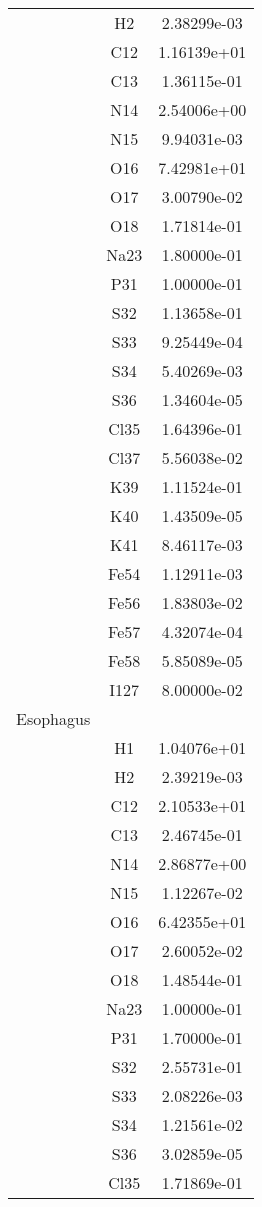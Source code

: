 \begin{centering}
\begin{longtable}{l c c}
& H2 & 2.38299e-03 \\ 
& C12 & 1.16139e+01 \\ 
& C13 & 1.36115e-01 \\ 
& N14 & 2.54006e+00 \\ 
& N15 & 9.94031e-03 \\ 
& O16 & 7.42981e+01 \\ 
& O17 & 3.00790e-02 \\ 
& O18 & 1.71814e-01 \\ 
& Na23 & 1.80000e-01 \\ 
& P31 & 1.00000e-01 \\ 
& S32 & 1.13658e-01 \\ 
& S33 & 9.25449e-04 \\ 
& S34 & 5.40269e-03 \\ 
& S36 & 1.34604e-05 \\ 
& Cl35 & 1.64396e-01 \\ 
& Cl37 & 5.56038e-02 \\ 
& K39 & 1.11524e-01 \\ 
& K40 & 1.43509e-05 \\ 
& K41 & 8.46117e-03 \\ 
& Fe54 & 1.12911e-03 \\ 
& Fe56 & 1.83803e-02 \\ 
& Fe57 & 4.32074e-04 \\ 
& Fe58 & 5.85089e-05 \\ 
& I127 & 8.00000e-02 \\ 
\hline
Esophagus & & \\
\hline
& H1 & 1.04076e+01 \\ 
& H2 & 2.39219e-03 \\ 
& C12 & 2.10533e+01 \\ 
& C13 & 2.46745e-01 \\ 
& N14 & 2.86877e+00 \\ 
& N15 & 1.12267e-02 \\ 
& O16 & 6.42355e+01 \\ 
& O17 & 2.60052e-02 \\ 
& O18 & 1.48544e-01 \\ 
& Na23 & 1.00000e-01 \\ 
& P31 & 1.70000e-01 \\ 
& S32 & 2.55731e-01 \\ 
& S33 & 2.08226e-03 \\ 
& S34 & 1.21561e-02 \\ 
& S36 & 3.02859e-05 \\ 
& Cl35 & 1.71869e-01 \\ 

\end{longtable}
\end{centering}
